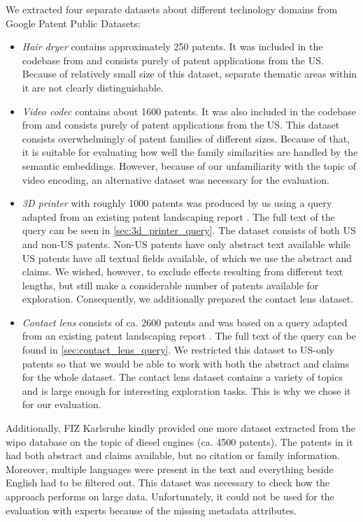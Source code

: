 We extracted four separate datasets about different technology domains from Google Patent Public Datasets:
\begin{itemize}
	\item \textit{Hair dryer} contains approximately 250 patents. It was included in the codebase from \cite{Abood2018a} and consists purely of patent applications from the US. Because of relatively small size of this dataset, separate thematic areas within it are not clearly distinguishable.
	\item \textit{Video codec} contains about 1600 patents. It was also included in the codebase from \cite{Abood2018a} and consists purely of patent applications from the US. This dataset consists overwhelmingly of patent families of different sizes. Because of that, it is suitable for evaluating how well the family similarities are handled by the semantic embeddings. However, because of our unfamiliarity with the topic of video encoding, an alternative dataset was necessary for the evaluation.
	\item \textit{3D printer} with roughly 1000 patents was produced by us using a query adapted from an existing patent landscaping report \cite{report_3d}. The full text of the query can be seen in \autoref{sec:3d_printer_query}. The dataset consists of both US and non-US patents. Non-US patents have only abstract text available while US patents have all textual fields available, of which we use the abstract and claims. We wished, however, to exclude effects resulting from different text lengths, but still make a considerable number of patents available for exploration. Consequently, we additionally prepared the contact lens dataset.
	\item \textit{Contact lens} consists of ca. 2600 patents and was based on a query adapted from an existing patent landscaping report \cite{report_lenses}. The full text of the query can be found in \autoref{sec:contact_lens_query}. We restricted this dataset to US-only patents so that we would be able to work with both the abstract and claims for the whole dataset. The contact lens dataset contains a variety of topics and is large enough for interesting exploration tasks. This is why we chose it for our evaluation.
\end{itemize}

Additionally, FIZ Karlsruhe kindly provided one more dataset extracted from the \gls{wipo} database on the topic of diesel engines (ca. 4500 patents).
The patents in it had both abstract and claims available, but no citation or family information.
Moreover, multiple languages were present in the text and everything beside English had to be filtered out.
This dataset was necessary to check how the approach performs on large data.
Unfortunately, it could not be used for the evaluation with experts because of the missing metadata attributes.

